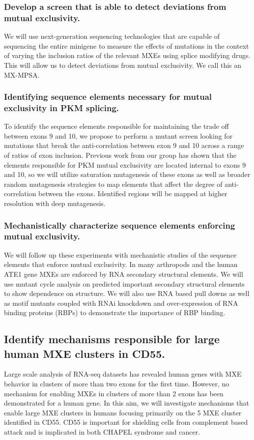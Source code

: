 \documentclass{article}
\begin{document}
\subsubsection{Develop a screen that is able to detect deviations from mutual exclusivity.} 
We will use next-generation sequencing technologies that are capable of sequencing the entire minigene to measure the effects of mutations in the context of varying the inclusion ratios of the relevant MXEs using splice modifying drugs. 
This will allow us to detect deviations from mutual exclusivity. We call this an MX-MPSA.
%
\subsubsection{Identifying sequence elements necessary for mutual exclusivity in PKM splicing.} 
To identify the sequence elements responsible for maintaining the trade off between exons 9 and 10, we propose to perform a mutant screen looking for mutations that break the anti-correlation between exon 9 and 10 across a range of ratios of exon inclusion. 
Previous work from our group has shown that the elements responsible for PKM mutual exclusivity are located internal to exons 9 and 10, so we will utilize saturation mutagenesis of these exons as well as broader random mutagenesis strategies to map elements that affect the degree of anti-correlation between the exons. 
Identified regions will be mapped at higher resolution with deep mutagenesis.
%
\subsubsection{Mechanistically characterize sequence elements enforcing mutual exclusivity.} We will follow up these experiments with mechanistic studies of the sequence elements that enforce mutual exclusivity. 
In many arthropods and the human ATE1 gene \cite{Graveley2005-oi, Jin2018-tq, Kalinina2021-jt} MXEs are enforced by RNA secondary structural elements. 
We will use mutant cycle analysis on predicted important secondary structural elements to show dependence on structure. 
We will also use RNA based pull downs as well as motif mutants coupled with RNAi knockdown and over-expression of RNA binding proteins (RBPs) to demonstrate the importance of RBP binding. 
%
\subsection{Identify mechanisms responsible for large human MXE clusters in CD55.}
Large scale analysis of RNA-seq datasets has revealed human genes with MXE behavior in clusters of more than two exons for the first time.\cite{Hatje2017-oj} 
However, no mechanism for enabling MXEs in clusters of more than 2 exons has been demonstrated for a human gene. 
In this aim, we will investigate mechanisms that enable large MXE clusters in humans focusing primarily on the 5 MXE cluster identified in CD55. 
CD55 is important for shielding cells from complement based attack and is implicated in both CHAPEL syndrome and cancer.\cite{Bharti2022-oz,Stallard2023-ll}
%
\end{document}
